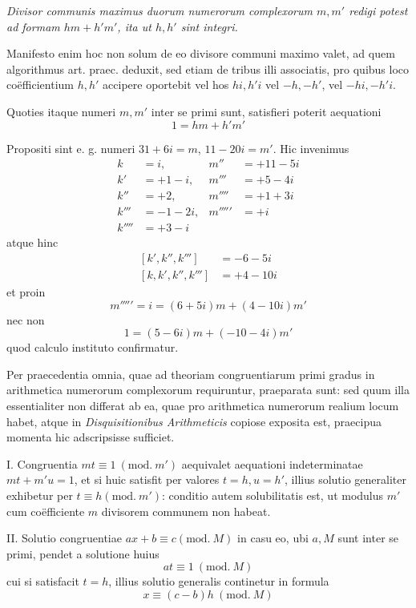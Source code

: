 \emph{Divisor communis maximus duorum numerorum complexorum $m,m'$ redigi potest ad formam $hm+h'm'$, ita ut $h,h'$ sint integri.}

Manifesto enim hoc non solum de eo divisore communi maximo valet, ad quem algorithmus art. praec. deduxit, sed etiam de tribus illi associatis, pro quibus loco coëfficientium $h,h'$ accipere oportebit vel hos $hi,h'i$ vel $-h,-h'$, vel $-hi,-h'i$.

Quoties itaque numeri $m,m'$ inter se primi sunt, satisfieri poterit aequationi
\[
1=hm+h'm'
\]

Propositi sint e. g. numeri $31+6i=m$, $11-20i=m'$. Hic invenimus
\[
\begin{aligned}
k&=i,&m''&=+11-5i\\
k'&=+1-i,&m'''&=+5-4i\\
k''&=+2,&m''''&=+1+3i\\
k'''&=-1-2i,&m'''''&=+i\\
k''''&=+3-i
\end{aligned}
\]
atque hinc
\[
\begin{aligned}
[k',k'',k''']&=-6-5i\\
[k,k',k'',k''']&=+4-10i
\end{aligned}
\]
et proin
\[
m'''''=i=(6+5i)m+(4-10i)m'
\]
nec non
\[
1=(5-6i)m+(-10-4i)m'
\]
quod calculo instituto confirmatur.

Per praecedentia omnia, quae ad theoriam congruentiarum primi gradus in arithmetica numerorum complexorum requiruntur, praeparata sunt: sed quum illa
%
essentialiter non differat ab ea, quae pro arithmetica numerorum realium locum habet, atque in \emph{Disquisitionibus Arithmeticis} copiose exposita est, praecipua momenta hic adscripsisse sufficiet.

I. Congruentia $mt\equiv1\ (\mathrm{mod.}\ m')$ aequivalet aequationi indeterminatae $mt+m'u=1$, et si huic satisfit per valores $t=h,u=h'$, illius solutio generaliter exhibetur per $t\equiv h(\mathrm{mod.}\ m')$: conditio autem solubilitatis est, ut modulus $m'$ cum coëfficiente $m$ divisorem communem non habeat.

II. Solutio congruentiae $ax+b\equiv c(\mathrm{mod.}\ M)$ in casu eo, ubi $a,M$ sunt inter se primi, pendet a solutione huius
\[
at\equiv1\ (\mathrm{mod.}\ M)
\]
cui si satisfacit $t=h$, illius solutio generalis continetur in formula
\[
x\equiv(c-b)h\ (\mathrm{mod.}\ M)
\]

